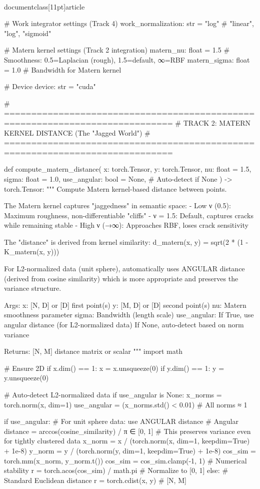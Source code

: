 \\documentclass[11pt]{article}
\begin{document}
\begin{CodeBlock}
    # Work integrator settings (Track 4)
    work_normalization: str = "log"  # "linear", "log", "sigmoid"

    # Matern kernel settings (Track 2 integration)
    matern_nu: float = 1.5           # Smoothness: 0.5=Laplacian (rough), 1.5=default, ∞=RBF
    matern_sigma: float = 1.0        # Bandwidth for Matern kernel

    # Device
    device: str = "cuda"


# =============================================================================
# TRACK 2: MATERN KERNEL DISTANCE (The "Jagged World")
# =============================================================================

def compute_matern_distance(
    x: torch.Tensor,
    y: torch.Tensor,
    nu: float = 1.5,
    sigma: float = 1.0,
    use_angular: bool = None,  # Auto-detect if None
) -> torch.Tensor:
    """
    Compute Matern kernel-based distance between points.

    The Matern kernel captures "jaggedness" in semantic space:
    - Low ν (0.5): Maximum roughness, non-differentiable "cliffs"
    - ν = 1.5: Default, captures cracks while remaining stable
    - High ν (→∞): Approaches RBF, loses crack sensitivity

    The "distance" is derived from kernel similarity:
        d_matern(x, y) = sqrt(2 * (1 - K_matern(x, y)))

    For L2-normalized data (unit sphere), automatically uses ANGULAR distance
    (derived from cosine similarity) which is more appropriate and preserves
    the variance structure.

    Args:
        x: [N, D] or [D] first point(s)
        y: [M, D] or [D] second point(s)
        nu: Matern smoothness parameter
        sigma: Bandwidth (length scale)
        use_angular: If True, use angular distance (for L2-normalized data)
                     If None, auto-detect based on norm variance

    Returns:
        [N, M] distance matrix or scalar
    """
    import math

    # Ensure 2D
    if x.dim() == 1:
        x = x.unsqueeze(0)
    if y.dim() == 1:
        y = y.unsqueeze(0)

    # Auto-detect L2-normalized data
    if use_angular is None:
        x_norms = torch.norm(x, dim=1)
        use_angular = (x_norms.std() < 0.01)  # All norms ≈ 1

    if use_angular:
        # For unit sphere data: use ANGULAR distance
        # Angular distance = arccos(cosine_similarity) / π ∈ [0, 1]
        # This preserves variance even for tightly clustered data
        x_norm = x / (torch.norm(x, dim=1, keepdim=True) + 1e-8)
        y_norm = y / (torch.norm(y, dim=1, keepdim=True) + 1e-8)
        cos_sim = torch.mm(x_norm, y_norm.t())
        cos_sim = cos_sim.clamp(-1, 1)  # Numerical stability
        r = torch.acos(cos_sim) / math.pi  # Normalize to [0, 1]
    else:
        # Standard Euclidean distance
        r = torch.cdist(x, y)  # [N, M]


\end{CodeBlock}
\end{document}
